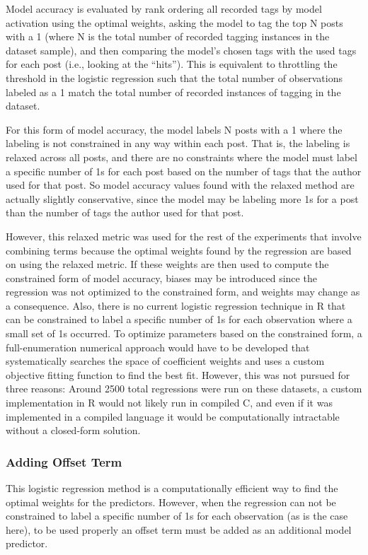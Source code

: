 \documentclass[man,floatsintext,donotrepeattitle]{apa6}
\begin{document}
Model accuracy is evaluated by rank ordering all recorded tags by model activation using the optimal weights,
asking the model to tag the top N posts with a 1 (where N is the total number of recorded tagging instances in the dataset sample),
and then comparing the model's chosen tags with the used tags for each post (i.e., looking at the ``hits'').
This is equivalent to throttling the threshold in the logistic regression such that the total number of observations labeled as a 1 match the total number of recorded instances of tagging in the dataset.

For this form of model accuracy, the model labels N posts with a 1 where the labeling is not constrained in any way within each post.
That is, the labeling is relaxed across all posts, and there are no constraints where the model must label a specific number of 1s for each post based on the number of tags that the author used for that post.
So model accuracy values found with the relaxed method are actually slightly conservative, since the model may be labeling more 1s for a post than the number of tags the author used for that post.

However, this relaxed metric was used for the rest of the experiments that involve combining terms because the optimal weights found by the regression are based on using the relaxed metric.
If these weights are then used to compute the constrained form of model accuracy, biases may be introduced since the regression was not optimized to the constrained form, and weights may change as a consequence.
Also, there is no current logistic regression technique in R that can be constrained to label a specific number of 1s for each observation where a small set of 1s occurred. 
To optimize parameters based on the constrained form,
a full-enumeration numerical approach would have to be developed that systematically searches the space of coefficient weights and uses a custom objective fitting function to find the best fit.
However, this was not pursued for three reasons:
Around \num{2500} total regressions were run on these datasets,
a custom implementation in R would not likely run in compiled C,
and even if it was implemented in a compiled language it would be computationally intractable without a closed-form solution.

\subsubsection{Adding Offset Term}

This logistic regression method is a computationally efficient way to find the optimal weights for the predictors.
However, when the regression can not be constrained to label a specific number of 1s for each observation (as is the case here), to be used properly an offset term must be added as an additional model predictor.
\end{document}

